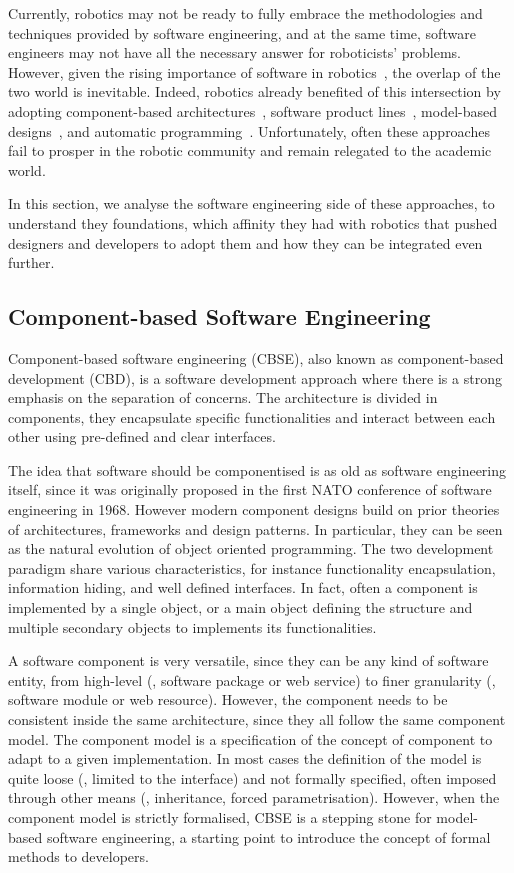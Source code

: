 Currently, robotics may not be ready to fully embrace the methodologies and techniques provided by software engineering, and at the same time, software engineers may not have all the necessary answer for roboticists' problems. However, given the rising importance of software in robotics~\cite{cousins2011exponential}, the overlap of the two world is inevitable. Indeed, robotics already benefited of this intersection by adopting component-based architectures~\cite{quigley2009ros, schlegel2014smartmdsd}, software product lines~\cite{gherardi2014modeling}, model-based designs~\cite{diego2010v3cmm}, and automatic programming~\cite{kumar2016rosmod}. Unfortunately, often these approaches fail to prosper in the robotic community and remain relegated to the academic world.

In this section, we analyse the software engineering side of these approaches, to understand they foundations, which affinity they had with robotics that pushed designers and developers to adopt them and how they can be integrated even further.

\subsection{Component-based Software Engineering}
Component-based software engineering (CBSE), also known as component-based development (CBD), is a software development approach where there is a strong emphasis on the separation of concerns. The architecture is divided in components, they encapsulate specific functionalities and interact between each other using pre-defined and clear interfaces.

The idea that software should be componentised is as old as software engineering itself, since it was originally proposed in the first NATO conference of software engineering in 1968. However modern component designs build on prior theories of architectures, frameworks and design patterns. In particular, they can be seen as the natural evolution of object oriented programming. The two development paradigm share various characteristics, for instance functionality encapsulation, information hiding, and well defined interfaces. In fact, often a component is implemented by a single object, or a main object defining the structure and multiple secondary objects to implements its functionalities.

A software component is very versatile, since they can be any kind of software entity, from high-level (\eg, software package or web service) to finer granularity (\eg, software module or web resource). However, the component needs to be consistent inside the same architecture, since they all follow the same component model. The component model is a specification of the concept of component to adapt to a given implementation. In most cases the definition of the model is quite loose (\eg, limited to the interface) and not formally specified, often imposed through other means (\eg, inheritance, forced parametrisation). However, when the component model is strictly formalised, CBSE is a stepping stone for model-based software engineering, a starting point to introduce the concept of formal methods to developers.

